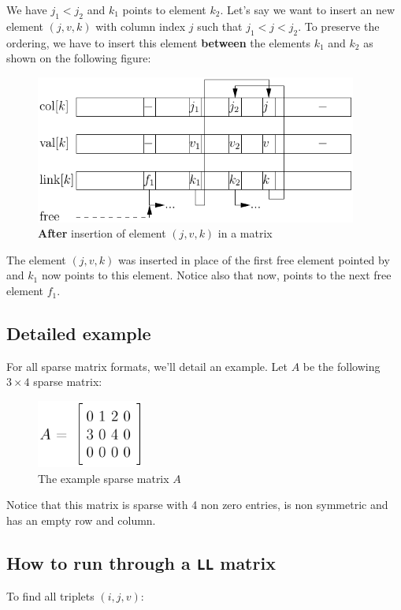 \documentclass[letterpaper,10pt,english]{sphinxmanual}
\begin{document}
We have \(j_1 < j_2\) and \(k_1\) points to element \(k_2\). Let's say we want to insert an new element \((j, v, k)\) with column index \(j\) such that \(j_1 <  j < j_2\).
To preserve the ordering, we have to insert this element \textbf{between} the elements \(k_1\) and \(k_2\) as shown on the following figure:
\begin{figure}[htbp]
\centering
\capstart

\includegraphics[width=300pt]{ll_mat_link_swap_right.pdf}
\caption{\textbf{After} insertion of element \((j, v, k)\) in a  matrix}\end{figure}

The element \((j, v, k)\) was inserted in place of the first free element pointed by  and \(k_1\) now points to this element. Notice also that now,  points to the next free element \(f_1\).


\subsection{Detailed example}
\label{sparse_matrix_formats:detailed-example}
For all sparse matrix formats, we'll detail an example. Let \(A\) be the following \(3 \times 4\) sparse matrix:
\begin{figure}[htbp]
\centering
\capstart

\includegraphics[width=100pt]{detailed_example_smatrix_formats.pdf}
\caption{The example sparse matrix \(A\)}\end{figure}

Notice that this matrix is sparse with 4 non zero entries, is non symmetric and has an empty row and column.


\subsection{How to run through a \texttt{LL} matrix}
\label{sparse_matrix_formats:how-to-run-through-a-ll-matrix}
To find all triplets \((i, j, v)\):
\end{document}
